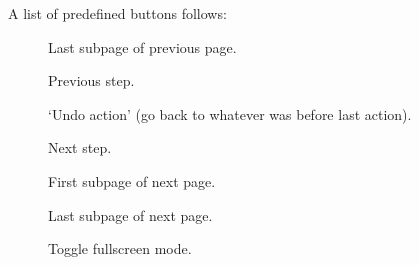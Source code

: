 \documentclass[12pt]{scrartcl}
\begin{document}
  A list of predefined buttons follows:
  \begin{description}

  \item[]
    Last subpage of previous page.

  \item[]
    Previous step.

  \item[]
    `Undo action' (go back to whatever was before last action).

  \item[]
    Next step.

  \item[]
    First subpage of next page.

  \item[]
    Last subpage of next page.

  \item[]
    Toggle fullscreen mode.

  \end{description}

\clearpage
\printindex
\end{document}
